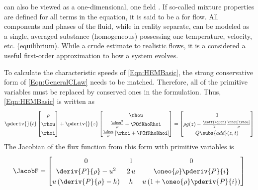  can also be viewed as a one-dimensional, one field \CLaw.
If so-called mixture properties are defined for all terms in the equation, it is said to be a  for flow.
All components and phases of the fluid, while in reality separate, can be modeled as a single, averaged substance (homogeneous) possessing one temperature, velocity, etc. (equilibrium).
While a crude estimate to realistic flows, it is a considered a useful first-order approximation to how a \THs system evolves.

To calculate the characteristic speeds of \cref{Eqn:HEMBasic}, the strong conservative form of \cref{Eqn:GeneralCLaw} needs to be matched.
Therefore, all of the primitive variables must be replaced by conserved ones in the formulation.
Thus, \cref{Eqn:HEMBasic} is written as 
\begin{equation}
    \renewcommand*{\arraystretch}{1.4}
    \pderiv{}{t}\begin{bmatrix}
                   \rho \\
                   \rhou \\
                   \rhoi 
                \end{bmatrix}
    + 
    \pderiv{}{z}\begin{bmatrix}
                    \rhou                 \\
                   \frac{\rhou^2}{\rho} + \POfRhoRhoi   \\
                    \frac{\rhou}{\rho}\left[\rhoi  + \POfRhoRhoi\right]
                \end{bmatrix}
             =  
    \begin{bmatrix}
        0 \\%
        \rho{g(z)} - \frac{\Keff(\qCon)}{2} \frac{\rhou |\rhou|}{\rho}  \\
        \dot{Q}\subs{add}(z,t)
    \end{bmatrix}
    \label{Eqn:HEMStrongConservative}
\end{equation}
The Jacobian of the flux function from this form with primitive variables is
\begin{equation}
    \renewcommand*{\arraystretch}{1.25}
    \JacobF = 
    \begin{bmatrix}
        0 & 1 & 0 \\
        \deriv{P}{\rho} - u^2 & 2\,u & \oneo{\rho}\pderiv{P}{i} \\
        u \left(\deriv{P}{\rho} - h\right) & h & u\left(1 + \oneo{\rho}\pderiv{P}{i}\right) 
    \end{bmatrix}
    \label{Eqn:FluxJacobianHEM}
\end{equation}
